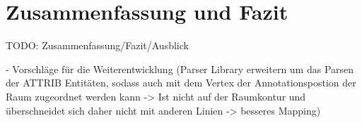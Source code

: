 \section{Zusammenfassung und Fazit}
\label{sec:summary}

TODO: Zusammenfassung/Fazit/Ausblick

- Vorschläge für die Weiterentwicklung (Parser Library erweitern um das Parsen der ATTRIB Entitäten, sodass auch mit dem Vertex der Annotationspostion der Raum zugeordnet werden kann -> Ist nicht auf der Raumkontur und überschneidet sich daher nicht mit anderen Linien -> besseres Mapping)
